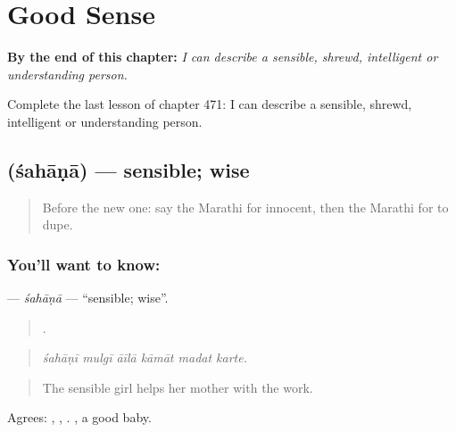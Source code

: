 
\chapter{Good Sense}
\label{ch:mr-good-sense}

\begin{chapteropening}
\textbf{By the end of this chapter:} \emph{I can describe a sensible, shrewd, intelligent or understanding person.}

Complete the last lesson of chapter 471: I can describe a sensible, shrewd, intelligent or understanding person.
\end{chapteropening}

\section[\texorpdfstring{\mr{शहाणा} (śahāṇā)}{शहाणा (śahāṇā)}]{ (śahāṇā) — sensible; wise}

\label{lesson:MR-C471-sahana}



\begin{quote}
Before the new one: say the Marathi for innocent, then the Marathi for to dupe.
\end{quote}

\subsection*{You'll want to know: }
\textbf{} — \emph{śahāṇā} — \textquotedblleft{}sensible; wise\textquotedblright{}.

\begin{quote}
     .
\end{quote}

\begin{quote}
\emph{śahāṇī mulgī āīlā kāmāt madat karte.}
\end{quote}

\begin{quote}
The sensible girl helps her mother with the work.
\end{quote}

Agrees: , , .  , a good baby.

